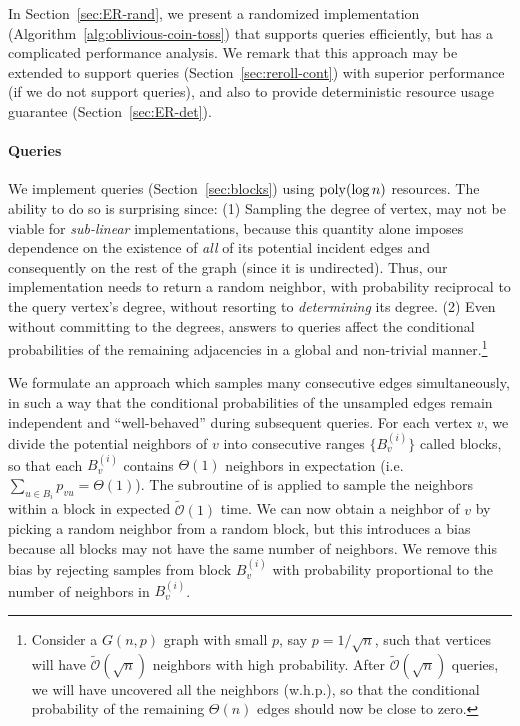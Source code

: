 In Section~\ref{sec:ER-rand}, we present a randomized implementation (Algorithm~\ref{alg:oblivious-coin-toss})
that supports  queries efficiently, but has a complicated performance analysis.
We remark that this approach may be extended to support  queries (Section~\ref{sec:reroll-cont}) with superior performance
(if we do not support  queries),
and also to provide deterministic resource usage guarantee (Section~\ref{sec:ER-det}).


\paragraph*{ Queries}
\label{par:random_neighbor_queries}
We implement  queries (Section~\ref{sec:blocks}) using $\mathrm{poly}(\log n)$ resources.
The ability to do so is surprising since:
(1) Sampling the degree of vertex, may not be viable for \emph{sub-linear} implementations, because this quantity alone
imposes dependence on the existence of \emph{all} of its potential incident edges and consequently on the rest of the graph (since it is undirected).
Thus, our implementation needs to return a random neighbor, with probability reciprocal to the query vertex's degree,
without resorting to \emph{determining} its degree.
(2) Even without committing to the degrees, answers to  queries
affect the conditional probabilities of the remaining adjacencies in a global and non-trivial manner.\footnote{
\label{conditional} Consider a $G(n,p)$ graph with small $p$, say $p = 1/\sqrt n$,
such that vertices will have $\tilde{\mathcal{O}}(\sqrt n)$ neighbors with high probability.
After $\tilde{\mathcal{O}}(\sqrt n)$  queries, we will have uncovered all the neighbors (w.h.p.),
so that the conditional probability of the remaining $\Theta(n)$ edges should now be close to zero.}

We formulate an approach which samples many consecutive edges simultaneously,
in such a way that the conditional probabilities of the unsampled edges remain independent and ``well-behaved'' during subsequent queries.
For each vertex $v$, we divide the potential neighbors of $v$ into consecutive ranges $\{B^{(i)}_v\}$ called blocks,
so that each $B^{(i)}_v$ contains $\Theta(1)$ neighbors in expectation (i.e. $\sum_{u\in B_i} p_{vu} = \Theta(1)$).
The subroutine of  is applied to sample the neighbors within a block in expected $\mathcal{\widetilde O}(1)$ time.
We can now obtain a neighbor of $v$ by picking a random neighbor from a random block,
but this introduces a bias because all blocks may not have the same number of neighbors.
We remove this bias by rejecting samples from block $B^{(i)}_v$ with probability proportional to the number of neighbors in $B^{(i)}_v$.




